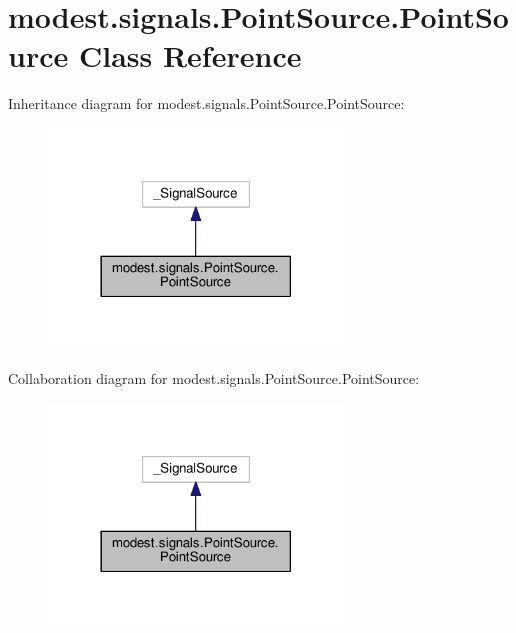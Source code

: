 \hypertarget{classmodest_1_1signals_1_1PointSource_1_1PointSource}{}\section{modest.\+signals.\+Point\+Source.\+Point\+Source Class Reference}
\label{classmodest_1_1signals_1_1PointSource_1_1PointSource}


Inheritance diagram for modest.\+signals.\+Point\+Source.\+Point\+Source\+:
\nopagebreak
\begin{figure}[H]
\begin{center}
\leavevmode
\includegraphics[width=222pt]{classmodest_1_1signals_1_1PointSource_1_1PointSource__inherit__graph}
\end{center}
\end{figure}


Collaboration diagram for modest.\+signals.\+Point\+Source.\+Point\+Source\+:
\nopagebreak
\begin{figure}[H]
\begin{center}
\leavevmode
\includegraphics[width=222pt]{classmodest_1_1signals_1_1PointSource_1_1PointSource__coll__graph}
\end{center}
\end{figure}
